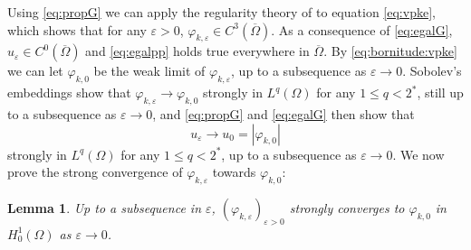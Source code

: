 \documentclass[10pt]{amsart}
\numberwithin{equation}{section}
\newcommand{\ve}{\varepsilon}
\newcommand{\vp}{\varphi}
\newcommand{\Om}{\Omega}
\theoremstyle{plain}
\newtheorem{lemme}{Lemma}[section]%
\theoremstyle{remark}
\begin{document}
Using \eqref{eq:propG} we can apply the regularity theory of \cite{BrezisKato} to equation \eqref{eq:vpke}, which shows that for any $\ve >0$, $\vp_{k,\ve} \in C^{3}(\overline{\Om})$. As a consequence of \eqref{eq:egalG}, $u_\ve \in C^0(\overline{\Om})$ and \eqref{eq:egalpp} holds true everywhere in $\overline{\Om}$. By \eqref{eq:bornitude:vpke} we can let $\vp_{k,0}$ be the weak limit of $\vp_{k,\ve}$, up to a subsequence as $\ve \to 0$. Sobolev's embeddings show that $\vp_{k,\ve} \to \vp_{k,0}$ strongly in $L^q(\Om)$ for any $1 \le q < 2^*$, still up to a subsequence as $\ve \to 0$, and  \eqref{eq:propG} and  \eqref{eq:egalG} then show that 
\begin{equation} \label{eq:convue} 
u_\ve \to u_0 =  |\vp_{k,0}|
\end{equation}  strongly in $L^q(\Om)$ for any $1 \le q < 2^*$, up to a subsequence as $\ve \to 0$. We now prove the strong convergence of $\vp_{k,\ve}$ towards $\vp_{k,0}$:
 
\begin{lemme}
Up to a subsequence in $\ve$, $(\vp_{k,\ve})_{\ve >0}$ strongly converges to $\vp_{k,0}$ in $H^1_0(\Om)$ as $\ve \to 0$.
\end{lemme} 
 
\end{document}
